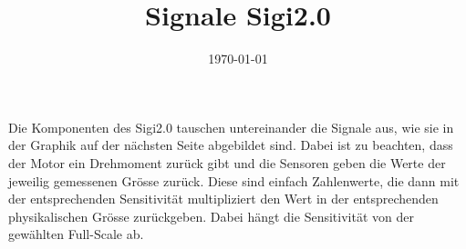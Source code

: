 \documentclass[a4paper]{article}
\title{Signale Sigi2.0}
\date{\today}
\begin{document}
\maketitle

Die Komponenten des Sigi2.0 tauschen untereinander die Signale aus, wie sie in der Graphik auf der nächsten Seite abgebildet sind. Dabei ist zu beachten, dass der Motor ein Drehmoment zurück gibt und die Sensoren geben die Werte der jeweilig gemessenen Grösse zurück. Diese sind einfach Zahlenwerte, die dann mit der entsprechenden Sensitivität multipliziert den Wert in der entsprechenden physikalischen Grösse zurückgeben. Dabei hängt die Sensitivität von der gewählten Full-Scale ab.
\begin{sidewaysfigure}
	\resizebox{\textwidth}{!}{
		
	}
\end{sidewaysfigure}
	
\end{document}
